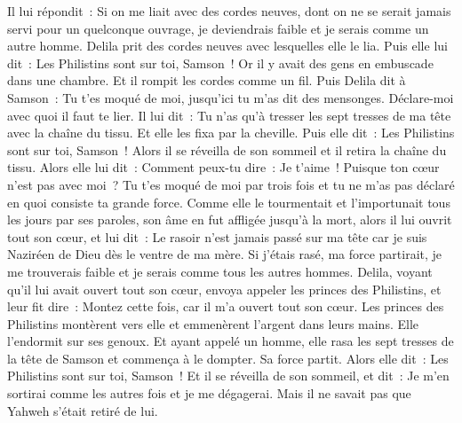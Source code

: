 \begin{multicols}{2}
Il lui répondit~: Si on me liait avec des cordes neuves, dont on ne se serait jamais servi pour un quelconque ouvrage, je deviendrais faible et je serais comme un autre homme.
Delila prit des cordes neuves avec lesquelles elle le lia. Puis elle lui dit~: Les Philistins sont sur toi, Samson~! Or il y avait des gens en embuscade dans une chambre. Et il rompit les cordes comme un fil.
Puis Delila dit à Samson~: Tu t'es moqué de moi, jusqu'ici tu m'as dit des mensonges. Déclare-moi avec quoi il faut te lier. Il lui dit~: Tu n'as qu'à tresser les sept tresses de ma tête avec la chaîne du tissu.
Et elle les fixa par la cheville. Puis elle dit~: Les Philistins sont sur toi, Samson~! Alors il se réveilla de son sommeil et il retira la chaîne du tissu.
Alors elle lui dit~: Comment peux-tu dire~: Je t'aime~! Puisque ton cœur n'est pas avec moi~? Tu t'es moqué de moi par trois fois et tu ne m'as pas déclaré en quoi consiste ta grande force.
Comme elle le tourmentait et l'importunait tous les jours par ses paroles, son âme en fut affligée jusqu'à la mort,
alors il lui ouvrit tout son cœur, et lui dit~: Le rasoir n'est jamais passé sur ma tête car je suis Naziréen de Dieu dès le ventre de ma mère. Si j'étais rasé, ma force partirait, je me trouverais faible et je serais comme tous les autres hommes.
Delila, voyant qu'il lui avait ouvert tout son cœur, envoya appeler les princes des Philistins, et leur fit dire~: Montez cette fois, car il m'a ouvert tout son cœur. Les princes des Philistins montèrent vers elle et emmenèrent l'argent dans leurs mains.
Elle l'endormit sur ses genoux. Et ayant appelé un homme, elle rasa les sept tresses de la tête de Samson et commença à le dompter. Sa force partit.
Alors elle dit~: Les Philistins sont sur toi, Samson~! Et il se réveilla de son sommeil, et dit~: Je m'en sortirai comme les autres fois et je me dégagerai. Mais il ne savait pas que Yahweh s'était retiré de lui.

\end{multicols}

